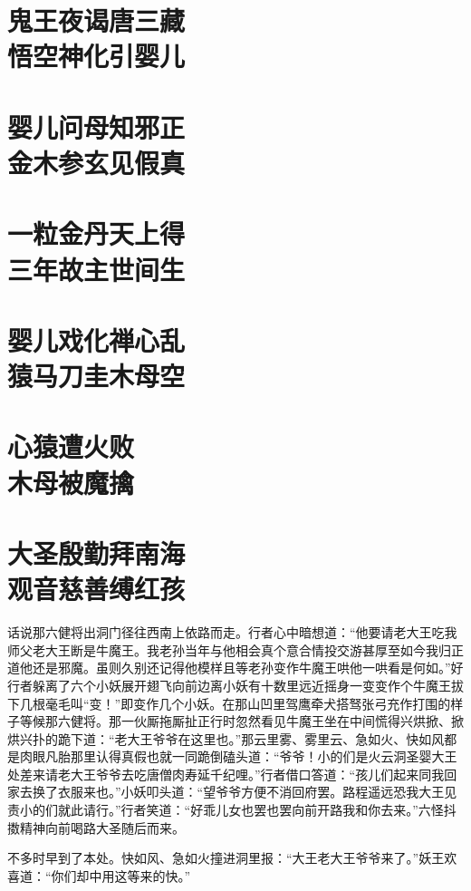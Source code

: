 \documentclass[12pt,UTF8]{ctexbook}
\begin{document}
{\chapter[鬼王夜谒唐三藏\ 悟空神化引婴儿]{鬼王夜谒唐三藏\\悟空神化引婴儿}
\chapter[婴儿问母知邪正\ 金木参玄见假真]{婴儿问母知邪正\\金木参玄见假真}
\chapter[一粒金丹天上得\ 三年故主世间生]{一粒金丹天上得\\三年故主世间生}
\chapter[婴儿戏化禅心乱\ 猿马刀圭木母空]{婴儿戏化禅心乱\\猿马刀圭木母空}
\chapter[心猿遭火败\ 木母被魔擒]{心猿遭火败\\木母被魔擒}
\chapter[大圣殷勤拜南海\ 观音慈善缚红孩]{大圣殷勤拜南海\\观音慈善缚红孩}

话说那六健将出洞门径往西南上依路而走。行者心中暗想道：“他要请老大王吃我师父老大王断是牛魔王。我老孙当年与他相会真个意合情投交游甚厚至如今我归正道他还是邪魔。虽则久别还记得他模样且等老孙变作牛魔王哄他一哄看是何如。”好行者躲离了六个小妖展开翅飞向前边离小妖有十数里远近摇身一变变作个牛魔王拔下几根毫毛叫“变！”即变作几个小妖。在那山凹里驾鹰牵犬搭驽张弓充作打围的样子等候那六健将。那一伙厮拖厮扯正行时忽然看见牛魔王坐在中间慌得兴烘掀、掀烘兴扑的跪下道：“老大王爷爷在这里也。”那云里雾、雾里云、急如火、快如风都是肉眼凡胎那里认得真假也就一同跪倒磕头道：“爷爷！小的们是火云洞圣婴大王处差来请老大王爷爷去吃唐僧肉寿延千纪哩。”行者借口答道：“孩儿们起来同我回家去换了衣服来也。”小妖叩头道：“望爷爷方便不消回府罢。路程遥远恐我大王见责小的们就此请行。”行者笑道：“好乖儿女也罢也罢向前开路我和你去来。”六怪抖擞精神向前喝路大圣随后而来。

不多时早到了本处。快如风、急如火撞进洞里报：“大王老大王爷爷来了。”妖王欢喜道：“你们却中用这等来的快。”

}
\end{document}
